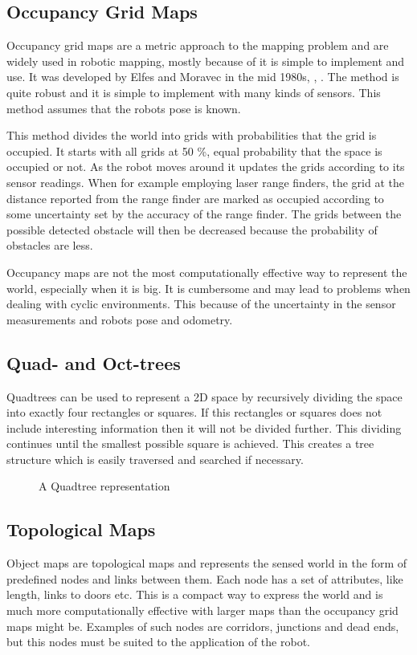 \subsection{Occupancy Grid Maps}
Occupancy grid maps are a metric approach to the mapping problem and are widely used in 
robotic mapping, mostly because of it is simple to implement and use. It was developed 
by Elfes and Moravec in the mid 1980s, \cite{elfes}, \cite{moravec}. The method is quite 
robust and it is simple to implement with many kinds of sensors. This method assumes that 
the robots pose is known.

This method divides the world into grids with probabilities that the grid is occupied. It
starts with all grids at 50 \%, equal probability that the space is occupied or not. As
the robot moves around it updates the grids according to its sensor readings. When for
example employing laser range finders, the grid at the distance reported from the range
finder are marked as occupied according to some uncertainty set by the accuracy of the
range finder. The grids between the possible detected obstacle will then be decreased
because the probability of obstacles are less. 

Occupancy maps are not the most computationally effective way to represent the world,
especially when it is big. It is cumbersome and may lead to problems when dealing with
cyclic environments. This because of the uncertainty in the sensor measurements and robots
pose and odometry. 


\subsection{Quad- and Oct-trees}
Quadtrees can be used to represent a 2D space by recursively dividing the space into
exactly four rectangles or squares. If this rectangles or squares does not include
interesting information then it will not be divided further. This dividing continues until
the smallest possible square is achieved. This creates a tree structure which is easily
traversed and searched if necessary. 

\begin{figure}[htbp]
    \centering
    \caption{A Quadtree representation}
    \label{chap2:fig-quadtree}
\end{figure}


\subsection{Topological Maps}
Object maps are topological maps and represents the sensed world in the form of predefined nodes and links
between them. Each node has a set of attributes, like length, links to doors etc. This is
a compact way to express the world and is much more computationally effective with larger
maps than the occupancy grid maps might be. Examples of such nodes are corridors,
junctions and dead ends, but this nodes must be suited to the application of the robot. 

